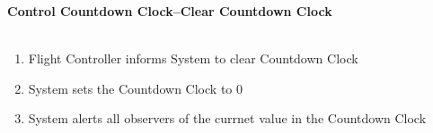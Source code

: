 \documentclass[letterpaper]{article}
\begin{document}
\noindent
\textbf{Control Countdown Clock--Clear Countdown Clock}\\\\
\begin{enumerate}
\item Flight Controller informs System to clear Countdown Clock
\item System sets the Countdown Clock to 0
\item System alerts all observers of the currnet value in the Countdown
Clock
\end{enumerate}
\end{document}
